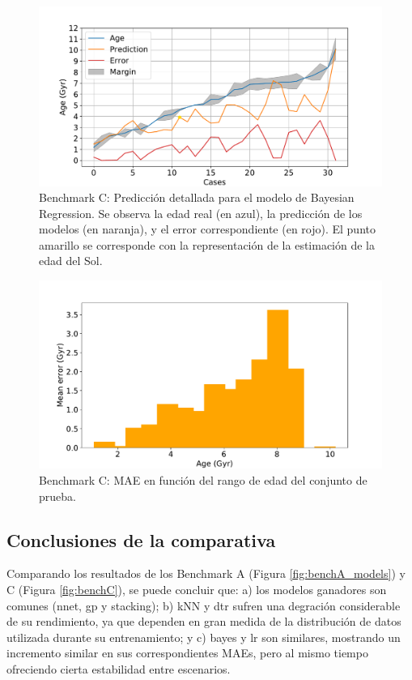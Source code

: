 \begin{figure}[H]
\begin{center}
 \includegraphics[width=0.8\linewidth]{Figuras/Experimentos/B_C_bayes_2.pdf}
\end{center}
\caption{Benchmark C: Predicción detallada para el modelo de Bayesian Regression. Se observa la edad real (en azul), la predicción de los modelos (en naranja), y el error correspondiente (en rojo). El punto amarillo se corresponde con la representación de la estimación de la edad del Sol.}
 \label{fig:benchC_details_bayes_2}
\end{figure}

\begin{figure}[H]
\begin{center}
 \includegraphics[width=0.8\linewidth]{Figuras/Experimentos/B_C_bayes_3.pdf}
\end{center}
\caption{Benchmark C: MAE en función del rango de edad del conjunto de prueba.}
 \label{fig:benchC_details_bayes_3}
\end{figure}

\subsection{Conclusiones de la comparativa}

Comparando los resultados de los Benchmark A (Figura \ref{fig:benchA_models}) y C (Figura \ref{fig:benchC}), se puede concluir que: a) los modelos ganadores son comunes (nnet, gp y stacking); b) kNN y dtr sufren una degración considerable de su rendimiento, ya que dependen en gran medida de la distribución de datos utilizada durante su entrenamiento; y c) bayes y lr son similares, mostrando un incremento similar en sus correspondientes MAEs, pero al mismo tiempo ofreciendo cierta estabilidad entre escenarios.

